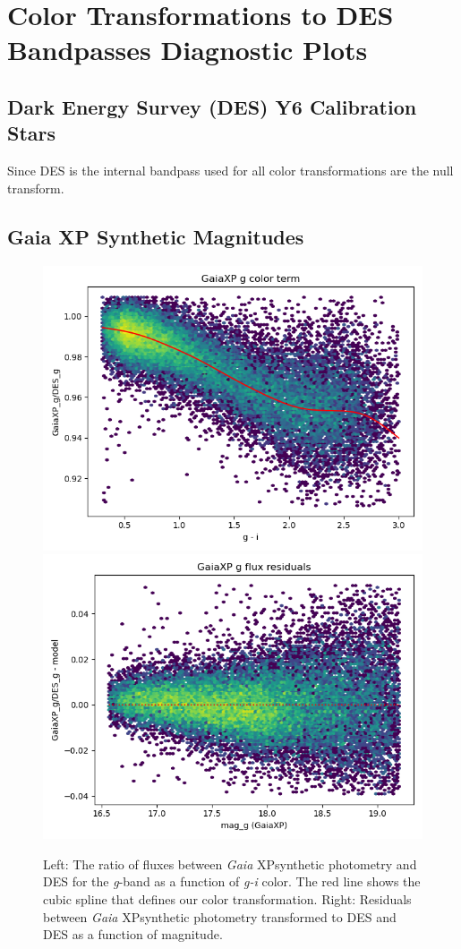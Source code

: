 \section{Color Transformations to DES Bandpasses Diagnostic Plots}
\label{app:colorplots}
\subsection{Dark Energy Survey (DES) Y6 Calibration Stars}
Since DES is the internal bandpass used for \monster all color transformations are the null transform.

\subsection{Gaia XP Synthetic Magnitudes}
\begin{figure}
    \includegraphics[width=0.49\linewidth]{./figures/color_terms/GaiaXP_to_DES_band_g_color_term.png}
    \includegraphics[width=0.49\linewidth]{./figures/color_terms/GaiaXP_to_DES_band_g_flux_residuals.png}
    \caption{Left: The ratio of fluxes between \emph{Gaia} XPsynthetic photometry and DES for the \textit{g}-band as a function of \textit{g-i} color. The red line shows the cubic spline that defines our color transformation.
    Right: Residuals between \emph{Gaia} XPsynthetic photometry transformed to DES and DES as a function of magnitude.}
    \label{fig:acolor-xp-g}
\end{figure}
